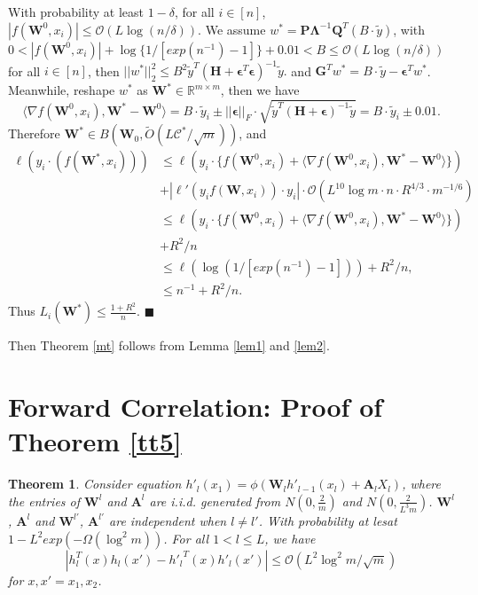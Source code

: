 \documentclass{article}
\newcommand{\cO}{\mathcal{O}}
\newtheorem{theo}{\textbf{Theorem}}
\newcommand*{\QEDA}{\hfill\ensuremath{\blacksquare}}%
\begin{document}
With probability at least $1-\delta$, for all $i\in [n]$, $ |f(\bm{W}^0,x_i)|\leq \cO(L\log(n/\delta))$.
 We assume $w^*=\bm{P}\bm{\Lambda}^{-1}\bm{Q}^T(B\cdot \widetilde{y})$, with $0<|f(\bm{W}^0,x_i)|+\log\{1/[exp(n^{-1})-1]\}+0.01<B\leq \cO(L\log(n/\delta))$ for all $i\in [n]$, then $||w^*||^2_2\leq B^2\widetilde{y}^T ( \bm{H}+\bm{\epsilon}^T\bm{\epsilon})^{-1} \widetilde{y}.$ and $\bm{G}^Tw^*=B\cdot \widetilde{y}-\bm{\epsilon}^Tw^*$. Meanwhile, reshape $w^*$ as $\bm{W}^*\in \mathbb{R}^{m\times m}$, then we have
 \begin{equation}
 \langle \nabla f(\bm{W}^0,x_i), \bm{W}^*-\bm{W}^0 \rangle =  B\cdot \widetilde{y}_i \pm||\bm{\epsilon}||_F \cdot \sqrt{\widetilde{y}^T (\bm{H}+\bm{\epsilon})^{-1}\widetilde{y}} = B\cdot \widetilde{y}_i \pm 0.01.
 \end{equation}
 Therefore $\bm{W}^* \in B(\bm{W}_0,\widetilde{O}(L\mathscr{C}^*/\sqrt{m}))$, and
 \begin{equation}
 \begin{aligned}
 \ell(y_i\cdot(f(\bm{W}^*,x_i)))&\leq\ell(y_i\cdot \{f(\bm{W}^0,x_i)+\langle \nabla f(\bm{W}^0,x_i), \bm{W}^*-\bm{W}^0 \rangle\}) \\
 &+|\ell'(y_if(\bm{W},x_i))\cdot y_i|\cdot \cO(L^{10}\log m\cdot n\cdot R^{4/3}\cdot m^{-1/6})\\
 &\leq\ell(y_i\cdot \{f(\bm{W}^0,x_i)+\langle \nabla f(\bm{W}^0,x_i), \bm{W}^*-\bm{W}^0 \rangle\}) \\
 &+R^2/n\\
 &\leq \ell(\log(1/[exp(n^{-1})-1])) +R^2/n,\\
 & \leq n^{-1}+R^2/n.
 \end{aligned}
 \end{equation}
Thus $L_i(\bm{W}^*)\leq \frac{1+R^2}{n}$.
\QEDA

Then Theorem \ref{mt} follows from Lemma \ref{lem1} and \ref{lem2}.

\section {Forward Correlation: Proof of Theorem \ref{tt5}}
\begin{theo}\label{t2}
Consider equation $h'_l(x_1)=\phi(\bm{W}_lh'_{l-1}(x_l)+\bm{A}_lX_l)$, where the entries of $\bm{W}^l$ and $\bm{A}^l$ are i.i.d. generated from $N(0,\frac{2}{m})$ and $N(0,\frac{2}{L^3m})$.  $\bm{W}^l$, $\bm{A}^l$ and $\bm{W}^{l'}$, $\bm{A}^{l'}$ are independent when $l\neq l'$. With probability at lesat $1-L^2exp(-\Omega(\log^2m))$. For all $1<l\leq L$, we have
\begin{equation}
|h_{l}^T(x)h_{l}(x')-  {h'_{l}}^{T}(x)h'_{l}(x')|\leq \cO(L^{2}\log^2m/\sqrt{m})
\end{equation}
for  $x,x'=x_1,x_2$.
\end{theo}
\end{document}
